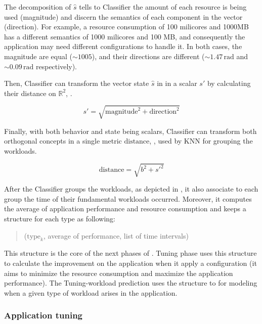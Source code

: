 The decomposition of $\hat{s}$ tells to Classifier the amount of each resource
is being used (magnitude) and discern the semantics of each component in the
vector (direction). For example, a resource consumption of 100 milicores and
1000MB has a different semantics of 1000 milicores and 100 MB, and consequently
the application may need different configurations to handle it. In both cases,
the magnitude are equal ($\sim 1005$), and their directions are different ($\sim
1.47\,\text{rad}$ and $\sim 0.09\,\text{rad}$ respectively).

Then, Classifier can transform the vector state $\hat{s}$ in in a scalar $s'$ by
calculating their distance on $\mathbb{R}^2$, .

\begin{equation}
  s' = \sqrt{\text{magnitude}^2 + \text{direction}^2}
  \label{eq:distance1}
\end{equation}

Finally, with both behavior and state being scalars, Classifier can transform
both orthogonal concepts in a single metric $\text{distance}$,
, used by KNN for grouping the workloads.

\begin{equation}
  \text{distance} = \sqrt{b^2 + s'^2}
  \label{eq:distance2}
\end{equation}

After the Classifier groups the workloads, as depicted in
, it also associate to each group the time of
their fundamental workloads occurred. Moreover, it computes the average of application
performance and resource consumption and keeps a structure for each type as following:

\begin{quote}
  \centering
  ($\text{type}_k$, average of performance, list of time intervals)
\end{quote}

This structure is the core of the next phases of \name. Tuning phase uses this
structure to calculate the improvement on the application when it apply a
configuration (it aims to minimize the resource consumption and maximize the
application performance). The Tuning-workload prediction uses the structure to
for modeling when a given type of workload arises in the application.

\subsubsection{Application tuning}

